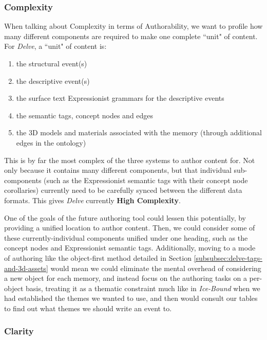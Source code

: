 \subsubsection{Complexity}\label{subsubsec:delve-complexity}

When talking about Complexity in terms of Authorability, we want to profile how many different components are required to make one complete ``unit" of content. For \textit{Delve}, a ``unit" of content is:

\begin{enumerate}
    \item the structural event(s)
    \item the descriptive event(s)
    \item the surface text Expressionist grammars for the descriptive events
    \item the semantic tags, concept nodes and edges
    \item the 3D models and materials associated with the memory (through additional edges in the ontology)
\end{enumerate}

This is by far the most complex of the three systems to author content for. Not only because it contains many different components, but that individual sub-components (such as the Expressionist semantic tags with their concept node corollaries) currently need to be carefully synced between the different data formats. This gives \textit{Delve} currently \textbf{High Complexity}.

One of the goals of the future authoring tool could lessen this potentially, by providing a unified location to author content. Then, we could consider some of these currently-individual components unified under one heading, such as the concept nodes and Expressionist semantic tags. Additionally, moving to a mode of authoring like the object-first method detailed in Section \ref{subsubsec:delve-tags-and-3d-assets} would mean we could eliminate the mental overhead of considering a new object for each memory, and instead focus on the authoring tasks on a per-object basis, treating it as a thematic constraint much like in \textit{Ice-Bound} when we had established the themes we wanted to use, and then would consult our tables to find out what themes we should write an event to.

\subsubsection{Clarity}\label{subsubsec:delve-clarity}

